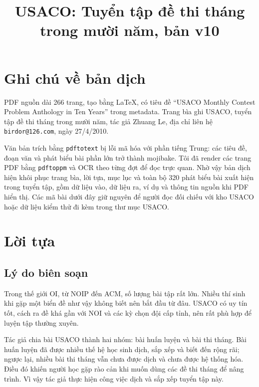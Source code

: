 \documentclass[11pt]{article}
\title{USACO: Tuyển tập đề thi tháng trong mười năm, bản v10}
\author{}
\date{}
\begin{document}
\maketitle


\section*{Ghi chú về bản dịch}

PDF nguồn dài 266 trang, tạo bằng LaTeX, có tiêu đề ``USACO Monthly
Contest Problem Anthology in Ten Years'' trong metadata. Trang bìa ghi
USACO, tuyển tập đề thi tháng trong mười năm, tác giả Zhuang Le, địa chỉ
liên hệ \texttt{birdor@126.com}, ngày 27/4/2010.

Văn bản trích bằng \texttt{pdftotext} bị lỗi mã hóa với phần tiếng Trung:
các tiêu đề, đoạn văn và phát biểu bài phần lớn trở thành mojibake. Tôi đã
render các trang PDF bằng \texttt{pdftoppm} và OCR theo từng đợt để đọc trực
quan. Nhờ vậy bản dịch hiện khôi phục trang bìa, lời tựa, mục lục và toàn bộ
320 phát biểu bài xuất hiện trong tuyển tập, gồm dữ liệu vào, dữ liệu ra, ví
dụ và thông tin nguồn khi PDF hiển thị. Các mã bài dưới đây giữ nguyên để
người đọc đối chiếu với kho USACO hoặc dữ liệu kiểm thử đi kèm trong thư mục
USACO.

\section{Lời tựa}

\subsection{Lý do biên soạn}

Trong thế giới OI, từ NOIP đến ACM, số lượng bài tập rất lớn. Nhiều thí sinh
khi gặp một biển đề như vậy không biết nên bắt đầu từ đâu. USACO có uy tín
tốt, cách ra đề khá gần với NOI và các kỳ chọn đội cấp tỉnh, nên rất phù hợp
để luyện tập thường xuyên.

Tác giả chia bài USACO thành hai nhóm: bài huấn luyện và bài thi tháng. Bài
huấn luyện đã được nhiều thế hệ học sinh dịch, sắp xếp và biết đến rộng rãi;
ngược lại, nhiều bài thi tháng vẫn chưa được dịch và chưa được hệ thống hóa.
Điều đó khiến người học gặp rào cản khi muốn dùng các đề thi tháng để nâng
trình. Vì vậy tác giả thực hiện công việc dịch và sắp xếp tuyển tập này.
\end{document}
